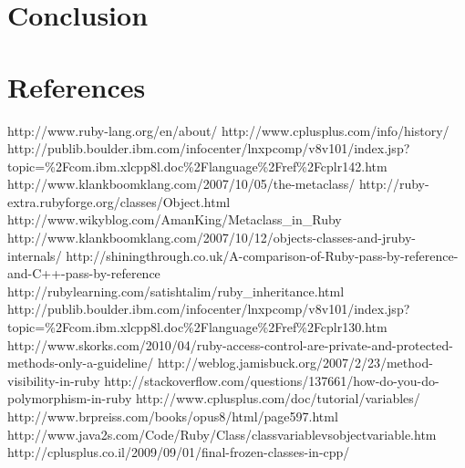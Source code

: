 \documentclass[10pt,a4paper,twocolumn]{article}
\begin{document}
\section{Conclusion}

\section{References}
http://www.ruby-lang.org/en/about/
http://www.cplusplus.com/info/history/
http://publib.boulder.ibm.com/infocenter/lnxpcomp/v8v101/index.jsp?topic=\%2Fcom.ibm.xlcpp8l.doc\%2Flanguage\%2Fref\%2Fcplr142.htm
http://www.klankboomklang.com/2007/10/05/the-metaclass/
http://ruby-extra.rubyforge.org/classes/Object.html
http://www.wikyblog.com/AmanKing/Metaclass_in_Ruby
http://www.klankboomklang.com/2007/10/12/objects-classes-and-jruby-internals/
http://shiningthrough.co.uk/A-comparison-of-Ruby-pass-by-reference-and-C++-pass-by-reference
http://rubylearning.com/satishtalim/ruby_inheritance.html
http://publib.boulder.ibm.com/infocenter/lnxpcomp/v8v101/index.jsp?topic=\%2Fcom.ibm.xlcpp8l.doc\%2Flanguage\%2Fref\%2Fcplr130.htm
http://www.skorks.com/2010/04/ruby-access-control-are-private-and-protected-methods-only-a-guideline/
http://weblog.jamisbuck.org/2007/2/23/method-visibility-in-ruby
http://stackoverflow.com/questions/137661/how-do-you-do-polymorphism-in-ruby
http://www.cplusplus.com/doc/tutorial/variables/
http://www.brpreiss.com/books/opus8/html/page597.html
http://www.java2s.com/Code/Ruby/Class/classvariablevsobjectvariable.htm
http://cplusplus.co.il/2009/09/01/final-frozen-classes-in-cpp/
\end{document}
